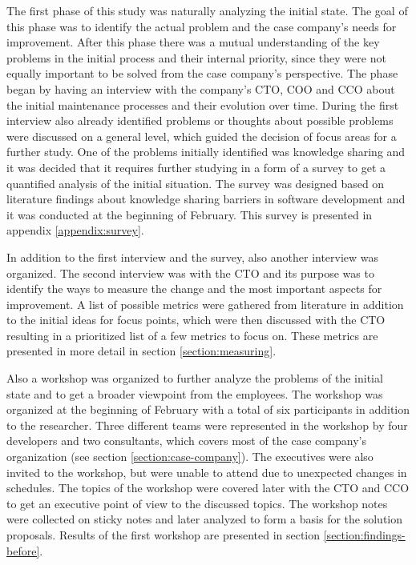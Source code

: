 The first phase of this study was naturally analyzing the initial state. The goal of this phase was to identify the actual problem and the case company's needs for improvement.
After this phase there was a mutual understanding of the key problems in the initial process and their internal priority, since they were not equally important to be solved
from the case company's perspective. The phase began by having an interview with the company's CTO, COO and CCO about the initial maintenance processes and their evolution
over time. During the first interview also already identified problems or thoughts about possible problems were discussed on a general level, which guided the decision
of focus areas for a further study. One of the problems initially identified was knowledge sharing and it was decided that it requires further studying in a form of a survey
to get a quantified analysis of the initial situation. The survey was designed based on literature findings about knowledge sharing barriers in software development and it
was conducted at the beginning of February. This survey is presented in appendix \ref{appendix:survey}.

In addition to the first interview and the survey, also another interview was organized. The second interview was with the CTO and its purpose was to
identify the ways to measure the change and the most important aspects for improvement. A list of possible metrics were gathered from
literature in addition to the initial ideas for focus points, which were then discussed with the CTO resulting in a prioritized list of a few metrics to focus on. These metrics are presented
in more detail in section \ref{section:measuring}.

Also a workshop was organized to further analyze the problems of the initial state and to get a broader viewpoint from the employees. The workshop was organized at the beginning of February
with a total of six participants in addition to the researcher. Three different teams were represented in the workshop by four developers and two consultants, which covers most
of the case company's organization (see section \ref{section:case-company}).
The executives were also invited to the workshop, but were unable to attend due to unexpected changes in schedules. The topics of the workshop were covered later with the CTO and CCO
to get an executive point of view to the discussed topics. The workshop notes were collected on sticky notes and later analyzed
to form a basis for the solution proposals. Results of the first workshop are presented in section \ref{section:findings-before}.

